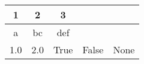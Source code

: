 \begin{tabular}{|c|c|c|c|c|}
\hline 
1 & 2 & 3 &  &  \\ 
\hline 
a & bc & def &  &  \\ 
\hline 
1.0 & 2.0 & True & False & None \\ 
\hline\end{tabular}

